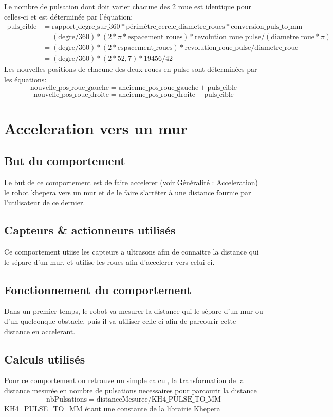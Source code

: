 \documentclass[11pt]{article} %
\begin{document}
Le nombre de pulsation dont doit varier chacune des 2 roue est identique pour celles-ci et est déterminée par l'équation:
	\begin{align*}
      		\text{puls\_cible} &= \text{rapport\_degre\_sur\_360} * \text{périmètre\_cercle\_diametre\_roues} * \text{conversion\_puls\_to\_mm} \\
                	                 &= (\text{degre}/360) * (2 * \pi * \text{espacement\_roues}) * \text{revolution\_roue\_pulse} / (\text{diametre\_roue}*\pi) \\
                 	                 &= (\text{degre}/360) * (2 * \text{espacement\_roues}) * \text{revolution\_roue\_pulse} / \text{diametre\_roue} \\
                 	                 &= (\text{degre}/360) * (2 * 52,7) * 19456 / 42
	\end{align*}
Les nouvelles positions de chacune des deux roues en pulse sont déterminées par les équations:
	\[
		\text{nouvelle\_pos\_roue\_gauche} = \text{ancienne\_pos\_roue\_gauche} + \text{puls\_cible}
	\]
	\[
		\text{nouvelle\_pos\_roue\_droite} = \text{ancienne\_pos\_roue\_droite} - \text{puls\_cible}
	\]	
\pagebreak	
	\section{Acceleration vers un mur}
		\subsection{But du comportement}
			Le but de ce comportement est de faire accelerer (voir Généralité : Acceleration) le robot khepera vers un mur et de le faire s'arrêter à une distance fournie par l'utilisateur de ce dernier.
		\subsection{Capteurs \& actionneurs utilisés}
			Ce comportement utiise les capteurs a ultrasons afin de connaitre la distance qui le sépare d'un mur, et utilise les roues afin d'accelerer vers celui-ci.
		\subsection{Fonctionnement du comportement}
			Dans un premier temps, le robot va mesurer la distance qui le sépare d'un mur ou d'un quelconque obstacle, puis il va utiliser celle-ci afin de parcourir cette distance en accelerant. 
		\subsection{Calculs utilisés}
			Pour ce comportement on retrouve un simple calcul, la transformation de la distance mesurée en nombre de pulsations necessaires pour parcourir la distance 
			\[
				\text{nbPulsations} = \text{distanceMesuree}/\text{KH4\_PULSE\_TO\_MM}
			\]
			KH4\_PULSE\_TO\_MM étant une constante de la librairie Khepera
\pagebreak
\end{document}
